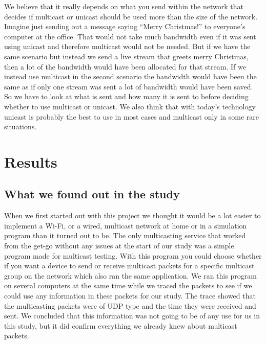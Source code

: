 \documentclass[9pt,a4paper]{acmproc}
\begin{document}
We believe that it really depends on what you send within the network that decides if multicast or unicast should be used more than the size of the network. Imagine just sending out a message saying “Merry Christmas!” to everyone's computer at the office. That would not take much bandwidth even if it was sent using unicast and therefore multicast would not be needed. But if we have the same scenario but instead we send a live stream that greets merry Christmas, then a lot of the bandwidth would have been allocated for that stream. If we instead use multicast in the second scenario the bandwidth would have been the same as if only one stream was sent a lot of bandwidth would have been saved. So we have to look at what is sent and how many it is sent to before deciding whether to use multicast or unicast. We also think that with today's technology unicast is probably the best to use in most cases and multicast only in some rare situations. \cite{multExplained} \cite{whatIsMult} \cite{understandIpMult} 


\clearpage

\section{Results}

\subsection{What we found out in the study}

When we first started out with this project we thought it would be a lot easier to implement a Wi-Fi, or a wired, multicast network at home or in a simulation program than it turned out to be. The only multicasting service that worked from the get-go without any issues at the start of our study was a simple program made for multicast testing. With this program you could choose whether if you want a device to send or receive multicast packets for a specific multicast group on the network which also ran the same application. We ran this program on several computers at the same time while we traced the packets to see if we could use any information in these packets for our study. The trace showed that the multicasting packets were of UDP type and the time they were received and sent. We concluded that this information was not going to be of any use for us in this study, but it did confirm everything we already knew about multicast packets.
\end{document}
